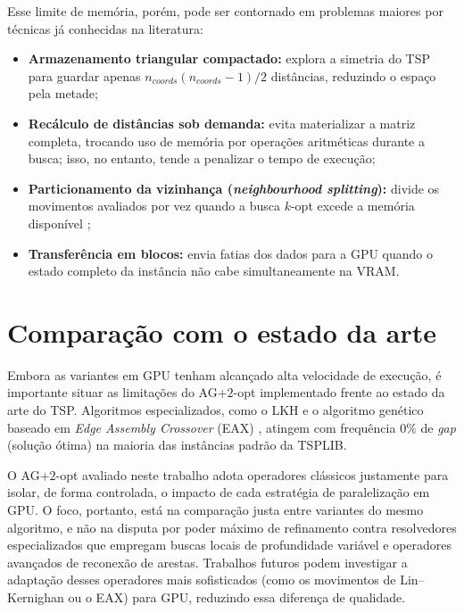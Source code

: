 Esse limite de memória, porém, pode ser contornado em problemas maiores por técnicas já conhecidas na literatura:

\begin{itemize}
      \item
            \textbf{Armazenamento triangular compactado:} explora a simetria do TSP para guardar apenas \(n_{coords}(n_{coords}-1)/2\) distâncias, reduzindo o espaço pela metade;
      \item
            \textbf{Recálculo de distâncias sob demanda:} evita materializar a matriz completa, trocando uso de memória por operações aritméticas durante a busca; isso, no entanto, tende a penalizar o tempo de execução;
      \item
            \textbf{Particionamento da vizinhança (\emph{neighbourhood splitting}):} divide os movimentos avaliados por vez quando a busca \(k\)-opt excede a memória disponível \autocite{schulz2013gpu};
      \item
            \textbf{Transferência em blocos:} envia fatias dos dados para a GPU quando o estado completo da instância não cabe simultaneamente na VRAM.
\end{itemize}

\section{Comparação com o estado da arte}\label{sec-52-comparacao-estado-arte}

Embora as variantes em GPU tenham alcançado alta velocidade de execução, é importante situar as limitações do AG+\(2\)-opt implementado frente ao estado da arte do TSP.
Algoritmos especializados, como o LKH \autocite{helsgaun2000effective} e o algoritmo genético baseado em \emph{Edge Assembly Crossover} (EAX) \autocite{nagata2013powerful}, atingem com frequência \(0\%\) de \emph{gap} (solução ótima) na maioria das instâncias padrão da TSPLIB.

O AG+\(2\)-opt avaliado neste trabalho adota operadores clássicos justamente para isolar, de forma controlada, o impacto de cada estratégia de paralelização em GPU.
O foco, portanto, está na comparação justa entre variantes do mesmo algoritmo, e não na disputa por poder máximo de refinamento contra resolvedores especializados que empregam buscas locais de profundidade variável e operadores avançados de reconexão de arestas.
Trabalhos futuros podem investigar a adaptação desses operadores mais sofisticados (como os movimentos de Lin--Kernighan ou o EAX) para GPU, reduzindo essa diferença de qualidade.

